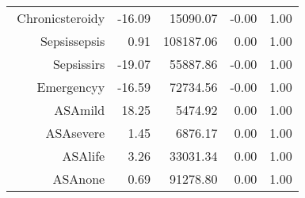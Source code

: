 \begin{tabular}{rrrrr}
$$  Chronic\-steroid\-y & -16.09 & 15090.07 & -0.00 & 1.00 \\ 
  Sepsis\-sepsis & 0.91 & 108187.06 & 0.00 & 1.00 \\ 
  Sepsis\-sirs & -19.07 & 55887.86 & -0.00 & 1.00 \\ 
  Emergency\-y & -16.59 & 72734.56 & -0.00 & 1.00 \\ 
  ASA\-mild & 18.25 & 5474.92 & 0.00 & 1.00 \\ 
  ASA\-severe & 1.45 & 6876.17 & 0.00 & 1.00 \\ 
  ASA\-life & 3.26 & 33031.34 & 0.00 & 1.00 \\ 
  ASA\-none & 0.69 & 91278.80 & 0.00 & 1.00 \\ 
   \hline
\end{tabular}

